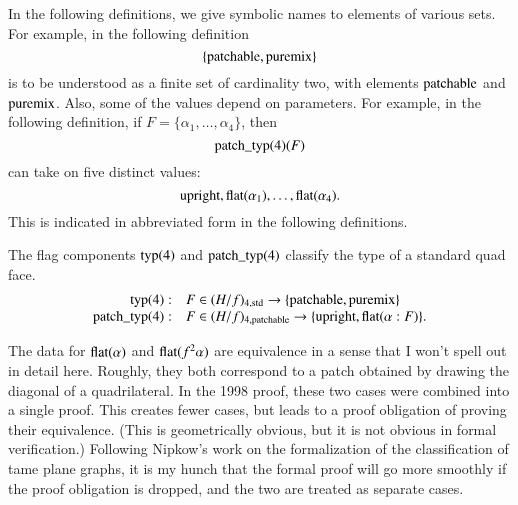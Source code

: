 

In the following definitions, we give symbolic names to elements
of various sets.  For example, in the following definition
    $$\{{\operatorname{patchable}},{\operatorname{puremix}}\}$$
is to be understood as a finite set of cardinality two, with
elements ${\operatorname{patchable}}$ and ${\operatorname{puremix}}$.  Also, some of the
values depend on parameters.  For example, in the following
definition, if $F=\{\alpha_1,\ldots,\alpha_4\}$, then
    $$
    {\operatorname{patch\_typ}}(4)(F)
    $$
can take on five distinct values:
    $$
    {\operatorname{upright}}, {\operatorname{flat}}(\alpha_1), \ldots,
    {\operatorname{flat}}(\alpha_4).
    $$
This is indicated in abbreviated form in the following
definitions.

\begin{definition}
The flag components ${\operatorname{typ}}(4)$ and ${\operatorname{patch\_typ}}(4)$
classify the type of a standard quad face.
    $$
    \begin{array}{rll}
    {\operatorname{typ}}(4):& F\in (H/f)_{4,{\operatorname{std}}}
    \to
    \{{\operatorname{patchable}},{\operatorname{puremix}}\}\\
    {\operatorname{patch\_typ}}(4):& F\in (H/f)_{4,{\operatorname{patchable}}}
    \to
    \{{\operatorname{upright}},{\operatorname{flat}}(\alpha:F)\}.
    \end{array}
    $$
\end{definition}

\begin{remark}
The data for ${\operatorname{flat}}(\alpha)$ and ${\operatorname{flat}}(f^2\alpha)$ are
equivalence in a sense that I won't spell out in detail here.
Roughly, they both correspond to a patch obtained by drawing the
diagonal of a quadrilateral. In the 1998 proof, these two cases
were combined into a single proof. This creates fewer cases, but
leads to a proof obligation of proving their equivalence.  (This
is geometrically obvious, but it is not obvious in formal
verification.) Following Nipkow's work on the formalization of the
classification of tame plane graphs, it is my hunch that the
formal proof will go more smoothly if the proof obligation is
dropped, and the two are treated as separate cases.
\end{remark}

